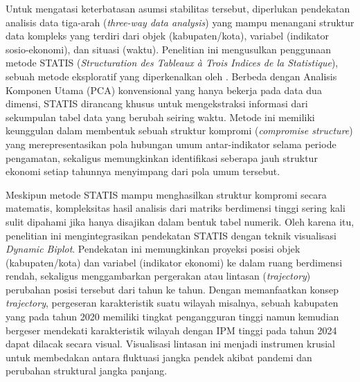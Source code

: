 \documentclass[a4paper]{article}
\theoremstyle{definition} %
\begin{document}
Untuk mengatasi keterbatasan asumsi stabilitas tersebut, diperlukan pendekatan analisis data tiga-arah (\textit{three-way data analysis}) yang mampu menangani struktur data kompleks yang terdiri dari objek (kabupaten/kota), variabel (indikator sosio-ekonomi), dan situasi (waktu). Penelitian ini mengusulkan penggunaan metode STATIS (\textit{Structuration des Tableaux à Trois Indices de la Statistique}), sebuah metode eksploratif yang diperkenalkan oleh \citet{lavit94,oliveira2024}. Berbeda dengan Analisis Komponen Utama (PCA) konvensional yang hanya bekerja pada data dua dimensi, STATIS dirancang khusus untuk mengekstraksi informasi dari sekumpulan tabel data yang berubah seiring waktu. Metode ini memiliki keunggulan dalam membentuk sebuah struktur kompromi (\textit{compromise structure}) yang merepresentasikan pola hubungan umum antar-indikator selama periode pengamatan, sekaligus memungkinkan identifikasi seberapa jauh struktur ekonomi setiap tahunnya menyimpang dari pola umum tersebut.

Meskipun metode STATIS mampu menghasilkan struktur kompromi secara matematis, kompleksitas hasil analisis dari matriks berdimensi tinggi sering kali sulit dipahami jika hanya disajikan dalam bentuk tabel numerik. Oleh karena itu, penelitian ini mengintegrasikan pendekatan STATIS dengan teknik visualisasi \textit{Dynamic Biplot}. Pendekatan ini memungkinkan proyeksi posisi objek (kabupaten/kota) dan variabel (indikator ekonomi) ke dalam ruang berdimensi rendah, sekaligus menggambarkan pergerakan atau lintasan (\textit{trajectory}) perubahan posisi tersebut dari tahun ke tahun. Dengan memanfaatkan konsep \textit{trajectory}, pergeseran karakteristik suatu wilayah misalnya, sebuah kabupaten yang pada tahun 2020 memiliki tingkat pengangguran tinggi namun kemudian bergeser mendekati karakteristik wilayah dengan IPM tinggi pada tahun 2024 dapat dilacak secara visual. Visualisasi lintasan ini menjadi instrumen krusial untuk membedakan antara fluktuasi jangka pendek akibat pandemi dan perubahan struktural jangka panjang.
\end{document}
